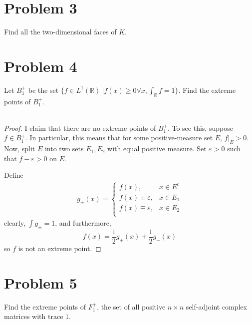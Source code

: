 \documentclass[fontsize=11pt]{scrartcl} %
\numberwithin{equation}{section} %
\numberwithin{figure}{section} %
\numberwithin{table}{section} %
\newcommand{\R}{\mathbb{R}}
\begin{document}
\newpage

\section*{Problem 3}
Find all the two-dimensional faces of $K$.

\newpage

\section*{Problem 4}
Let $B_1^+$ be the set $\{f\in L^1(\R)\ | f(x)\geq 0 \forall x, \int_{\R}f
=1\}$.
Find the extreme points of $B_1^+$.
\\
\\
\begin{proof}
    I claim that there are no extreme points of $B_1^+$. To see this, suppose
    $f\in B_1^+$. In particular, this means that for some positive-measure set
    $E$, $f|_E > 0$. Now, split $E$ into two sets $E_1, E_2$ with equal positive
    measure. Set $\varepsilon>0$ such that $f-\varepsilon >0$ on $E$.

    Define
    \[
\begin{aligned}
    g_{\pm}(x) =
    \begin{cases}
        f(x), &x\in E^c\\
        f(x)\pm\varepsilon, &x\in E_1\\
        f(x)\mp\varepsilon, &x\in E_2\\
    \end{cases}
\end{aligned}
    \]
    clearly, $\int g_{\pm} = 1$, and furthermore,
    \[
        f(x) = \frac{1}{2}g_+(x) + \frac{1}{2}g_-(x)
    \]
    so $f$ is not an extreme point.
\end{proof}

\newpage

\section*{Problem 5}
Find the extreme points of $F_1^+$, the set of all positive $n\times n$
self-adjoint complex matrices with trace $1$.
\end{document}
